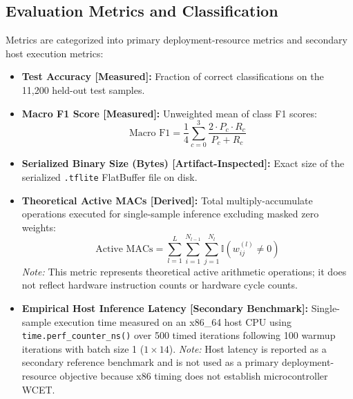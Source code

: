 \documentclass[journal,10pt]{IEEEtran}
\begin{document}
\subsection{Evaluation Metrics and Classification}
Metrics are categorized into primary deployment-resource metrics and secondary host execution metrics:
\begin{itemize}
    \item \textbf{Test Accuracy [Measured]:} Fraction of correct classifications on the 11,200 held-out test samples.
    \item \textbf{Macro F1 Score [Measured]:} Unweighted mean of class F1 scores:
    \begin{equation}
        \text{Macro F1} = \frac{1}{4} \sum_{c=0}^3 \frac{2 \cdot P_c \cdot R_c}{P_c + R_c}
    \end{equation}
    \item \textbf{Serialized Binary Size (Bytes) [Artifact-Inspected]:} Exact size of the serialized \texttt{.tflite} FlatBuffer file on disk.
    \item \textbf{Theoretical Active MACs [Derived]:} Total multiply-accumulate operations executed for single-sample inference excluding masked zero weights:
    \begin{equation}
        \text{Active MACs} = \sum_{l=1}^L \sum_{i=1}^{N_{l-1}} \sum_{j=1}^{N_l} \mathbb{I}(w_{ij}^{(l)} \ne 0)
    \end{equation}
    \textit{Note:} This metric represents theoretical active arithmetic operations; it does not reflect hardware instruction counts or hardware cycle counts.
    \item \textbf{Empirical Host Inference Latency [Secondary Benchmark]:} Single-sample execution time measured on an x86\_64 host CPU using \texttt{time.perf\_counter\_ns()} over 500 timed iterations following 100 warmup iterations with batch size 1 ($1 \times 14$).
    \textit{Note:} Host latency is reported as a secondary reference benchmark and is not used as a primary deployment-resource objective because x86 timing does not establish microcontroller WCET.
\end{itemize}
\end{document}
